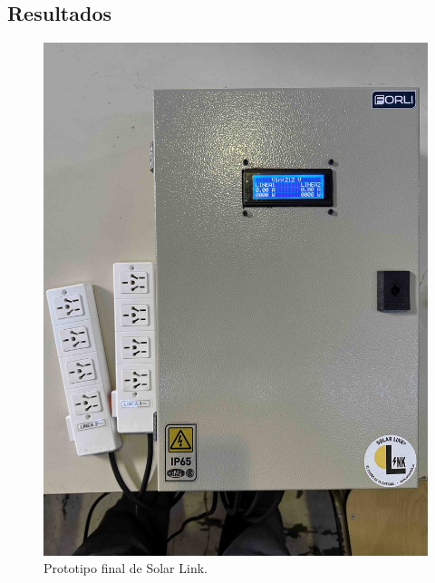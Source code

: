 \subsection{Resultados}

\begin{figure}[H]
    \includegraphics[width=0.9\linewidth]{proto-final/IMG_9418.jpg}
    \caption{Prototipo final de Solar Link.}
    \label{fig:final}
\end{figure}


